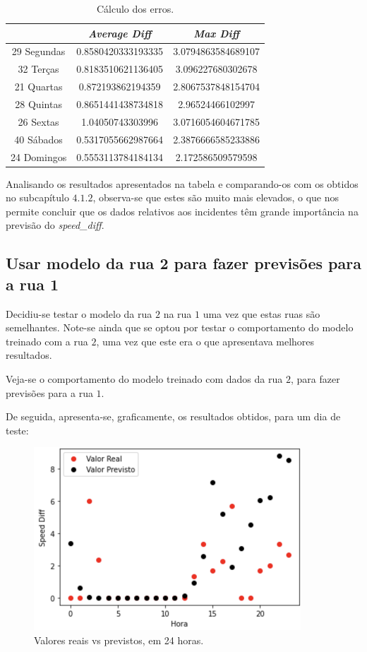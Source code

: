 \documentclass[a4paper, 12pt]{article}
\begin{document}
\begin{table}[H]
	\centering
	\begin{tabular}{||c||c|c||}
		\hline\hline
		& \textit{Average Diff} & \textit{Max Diff} \\
		\hline\hline
		29 Segundas & 
0.8580420333193335
 & 3.0794863584689107\\
		\hline
		32 Terças  &
0.8183510621136405& 3.096227680302678  \\
		\hline
		21 Quartas & 0.872193862194359
 & 2.8067537848154704 \\
		\hline
		28 Quintas  & 
0.8651441438734818
 & 2.96524466102997\\
		\hline
		26 Sextas & 1.04050743303996 & 3.0716054604671785 \\
		\hline
		40 Sábados  & 0.5317055662987664&2.3876666585233886  \\
		\hline
		24 Domingos & 0.5553113784184134
 & 2.172586509579598
 \\
		\hline\hline
	\end{tabular}
	\label{table:no_inc}
	\caption{Cálculo dos erros.}
\end{table}

Analisando os resultados apresentados na tabela e comparando-os com os obtidos no subcapítulo $4.1.2$, observa-se que estes são muito mais elevados, o que nos permite concluir que os dados relativos aos incidentes têm grande importância na previsão do \textit{speed\_diff}.

\subsection{Usar modelo da rua 2 para fazer previsões para a rua 1}

Decidiu-se testar o modelo da rua $2$ na rua $1$ uma vez que estas ruas são semelhantes. Note-se ainda que se optou por testar o comportamento do modelo treinado com a rua $2$, uma vez que este era o que apresentava melhores resultados.

Veja-se o comportamento do modelo treinado com dados da rua $2$, para fazer previsões para a rua $1$.

De seguida, apresenta-se, graficamente, os resultados obtidos, para um dia de teste:

\begin{figure}[H]
	\centering
	\includegraphics[width=10cm]{resultados/real_prev_mod2_rua1.png}
	\caption{Valores reais vs previstos, em 24 horas.}
\end{figure}
\end{document}
